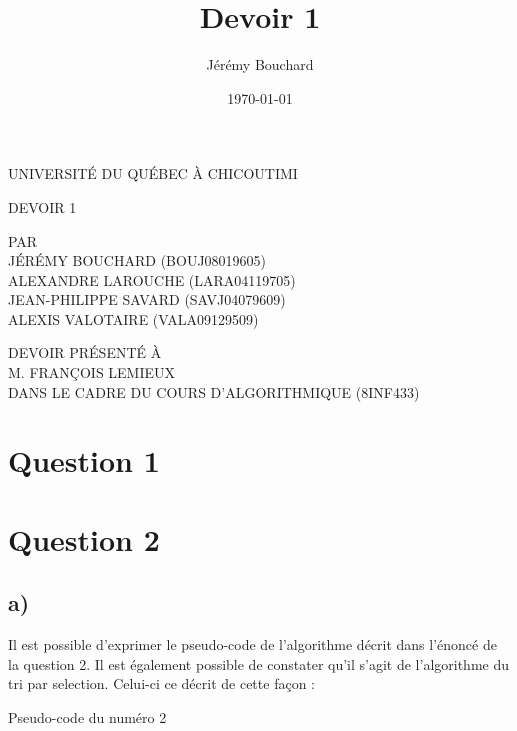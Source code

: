 \documentclass[12pt]{article}
\title{Devoir 1}
\author{Jérémy Bouchard}
\date{\today}
\begin{document}
  \begin{titlepage}
    \doublespacing
    \centering

    UNIVERSITÉ DU QUÉBEC À CHICOUTIMI \\

    \vspace{4.7cm}

    DEVOIR 1 \\

    \vspace{4.7cm}

    PAR \\
    JÉRÉMY BOUCHARD (BOUJ08019605) \\
    ALEXANDRE LAROUCHE (LARA04119705) \\
    JEAN-PHILIPPE SAVARD (SAVJ04079609) \\
    ALEXIS VALOTAIRE (VALA09129509) \\

    \vspace{4.7cm}

    DEVOIR PRÉSENTÉ À \\
    M. FRANÇOIS LEMIEUX \\
    DANS LE CADRE DU COURS D'ALGORITHMIQUE (8INF433)

  \end{titlepage}

  \newpage

  \newpage

  \onehalfspacing

  \section*{Question 1}

  \newpage

  \section*{Question 2}
  \subsection*{a)}

    Il est possible d'exprimer le pseudo-code de l'algorithme décrit dans
    l'énoncé de la question 2. Il est également possible de constater qu'il
    s'agit de l'algorithme du tri par selection. Celui-ci ce décrit de cette
    façon : \newline

    \begin{algorithm}[H]
      \caption{Pseudo-code du numéro 2}
    \end{algorithm}
\end{document}
